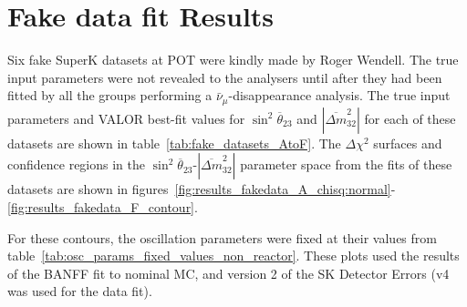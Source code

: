 
\section{Fake data fit Results}

\label{app:fake_data_fit_results}

Six fake SuperK datasets at \FakePot POT were kindly made by Roger Wendell. The true input parameters 
were not revealed to the analysers until after they had been fitted by all the groups performing a 
$\bar{\nu}_{\mu}$-disappearance analysis. The true input parameters and VALOR best-fit values for 
$\sin^{2}\overline{\theta}_{23}$ and $|\overline{\Delta m}^{2}_{32}|$ for each of these datasets are shown 
in table~\ref{tab:fake_datasets_AtoF}. The $\Delta \chi^{2}$ surfaces and confidence regions in the 
$\sin^{2}\overline{\theta}_{23}$-$|\overline{\Delta m}^{2}_{32}|$ parameter space from the fits of these datasets 
are shown in figures~\ref{fig:results_fakedata_A_chisq:normal}-\ref{fig:results_fakedata_F_contour}.

For these contours, the oscillation parameters were fixed at their values from table~\ref{tab:osc_params_fixed_values_non_reactor}.
These plots used the results of the BANFF fit to nominal MC, and version 2 of the SK Detector Errors (v4 was used for the data fit).

